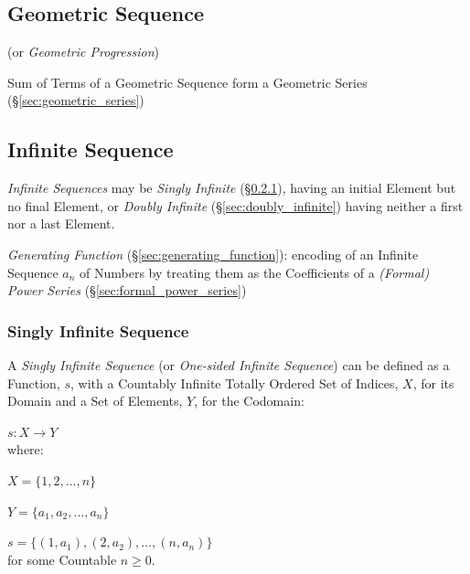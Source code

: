 \subsection{Geometric Sequence}\label{sec:geometric_sequence}

(or \emph{Geometric Progression})

Sum of Terms of a Geometric Sequence form a Geometric Series
(\S\ref{sec:geometric_series})



\subsection{Infinite Sequence}\label{sec:infinite_sequence}

\emph{Infinite Sequences} may be \emph{Singly Infinite}
(\S\ref{sec:singly_infinite}), having an initial Element but no final
Element, or \emph{Doubly Infinite} (\S\ref{sec:doubly_infinite})
having neither a first nor a last Element.

\fist \emph{Generating Function} (\S\ref{sec:generating_function}): encoding of
an Infinite Sequence $a_n$ of Numbers by treating them as the Coefficients of a
\emph{(Formal) Power Series} (\S\ref{sec:formal_power_series})



\subsubsection{Singly Infinite Sequence}\label{sec:singly_infinite}

A \emph{Singly Infinite Sequence} (or \emph{One-sided Infinite
  Sequence}) can be defined as a Function, $s$, with a Countably
Infinite Totally Ordered Set of Indices, $X$, for its Domain and a Set
of Elements, $Y$, for the Codomain:

  $s : X \rightarrow Y$ \\
where:

  $X = \{1,2,\ldots,n\}$

  $Y = \{a_1, a_2,\ldots,a_n\}$

  $s = \{(1,a_1), (2,a_2),\ldots, (n,a_n)\}$ \\
for some Countable $n \geq 0$.

